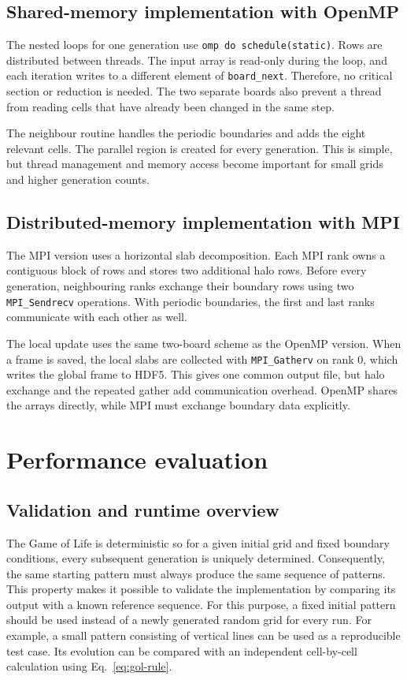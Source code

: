 \documentclass[11pt,a4paper]{article}
\begin{document}
\subsection{Shared-memory implementation with OpenMP}
The nested loops for one generation use \texttt{omp do schedule(static)}. Rows
are distributed between threads. The input array is read-only during the loop,
and each iteration writes to a different element of \texttt{board\_next}.
Therefore, no critical section or reduction is needed. The two separate boards
also prevent a thread from reading cells that have already been changed in the
same step.

The neighbour routine handles the periodic boundaries and adds the eight
relevant cells. The parallel region is created for every generation. This is
simple, but thread management and memory access become important for small grids 
and higher generation counts.

\subsection{Distributed-memory implementation with MPI}
The MPI version uses a horizontal slab decomposition. Each MPI rank owns a
contiguous block of rows and stores two additional halo rows. Before every
generation, neighbouring ranks exchange their boundary rows using two
\texttt{MPI\_Sendrecv} operations. With periodic boundaries, the first and last
ranks communicate with each other as well.

The local update uses the same two-board scheme as the OpenMP version. When a
frame is saved, the local slabs are collected with \texttt{MPI\_Gatherv} on
rank 0, which writes the global frame to HDF5. This gives one common output
file, but halo exchange and the repeated gather add communication overhead.
OpenMP shares the arrays directly, while MPI must exchange boundary data
explicitly.


\section{Performance evaluation}

\subsection{Validation and runtime overview}
The Game of Life is deterministic so for a given initial grid and fixed boundary
conditions, every subsequent generation is uniquely determined. Consequently,
the same starting pattern must always produce the same sequence of patterns.
This property makes it possible to validate the implementation by comparing
its output with a known reference sequence. For this purpose, a fixed initial
pattern should be used instead of a newly generated random grid for every run.
For example, a small pattern consisting of vertical lines can be used as a
reproducible test case. Its evolution can be compared with an independent
cell-by-cell calculation using Eq.~\eqref{eq:gol-rule}.
\end{document}
